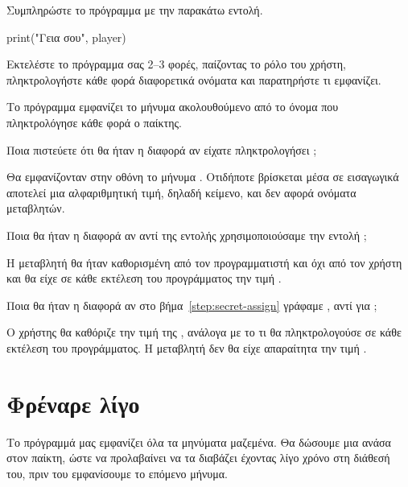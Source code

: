 \documentclass[a4paper,11pt,oneside]{book}
\begin{document}
\begin{step}
\label{step:print-variable}
Συμπληρώστε το πρόγραμμα με την παρακάτω εντολή.

\begin{pynew}
print("Γεια σου", player)
\end{pynew}

Εκτελέστε το πρόγραμμα σας 2--3 φορές, παίζοντας το ρόλο του χρήστη, πληκτρολογήστε κάθε φορά διαφορετικά ονόματα και παρατηρήστε τι εμφανίζει.

\begin{answer}
Το πρόγραμμα εμφανίζει το μήνυμα  ακολουθούμενο από το όνομα που πληκτρολόγησε κάθε φορά ο παίκτης.
\end{answer}

Ποια πιστεύετε ότι θα ήταν η διαφορά αν είχατε πληκτρολογήσει ;

\begin{answer}
Θα εμφανίζονταν στην οθόνη το μήνυμα . Οτιδήποτε βρίσκεται μέσα σε εισαγωγικά αποτελεί μια αλφαριθμητική τιμή, δηλαδή κείμενο, και δεν αφορά ονόματα μεταβλητών.
\end{answer}

Ποια θα ήταν η διαφορά αν αντί της εντολής  χρησιμοποιούσαμε την εντολή ;

\begin{answer}
	Η μεταβλητή  θα ήταν καθορισμένη από τον προγραμματιστή και όχι από τον χρήστη και θα είχε σε κάθε εκτέλεση του προγράμματος την τιμή .
\end{answer}

Ποια θα ήταν η διαφορά αν στο βήμα~\ref{step:secret-assign} γράφαμε , αντί για ;

\begin{answer}
Ο χρήστης θα καθόριζε την τιμή της , ανάλογα με το τι θα πληκτρολογούσε σε κάθε εκτέλεση του προγράμματος. Η μεταβλητή  δεν θα είχε απαραίτητα την τιμή . 
\end{answer}
\end{step}

\section{Φρέναρε λίγο}

Το πρόγραμμά μας εμφανίζει όλα τα μηνύματα μαζεμένα. Θα δώσουμε μια ανάσα στον παίκτη, ώστε να προλαβαίνει να τα διαβάζει έχοντας λίγο χρόνο στη διάθεσή του, πριν του εμφανίσουμε το επόμενο μήνυμα. 
\end{document}
